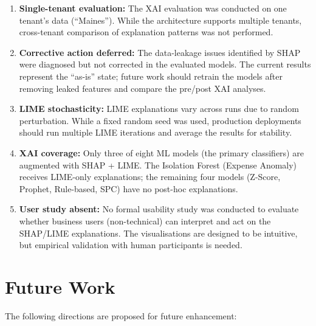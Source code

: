 \documentclass[12pt,a4paper]{report}
\begin{document}
\begin{enumerate}[label=\arabic*.]
  \item \textbf{Single-tenant evaluation:} The XAI evaluation was conducted on one tenant's data (``Maines''). While the architecture supports multiple tenants, cross-tenant comparison of explanation patterns was not performed.

  \item \textbf{Corrective action deferred:} The data-leakage issues identified by SHAP were diagnosed but not corrected in the evaluated models. The current results represent the ``as-is'' state; future work should retrain the models after removing leaked features and compare the pre/post XAI analyses.

  \item \textbf{LIME stochasticity:} LIME explanations vary across runs due to random perturbation. While a fixed random seed was used, production deployments should run multiple LIME iterations and average the results for stability.

  \item \textbf{XAI coverage:} Only three of eight ML models (the primary classifiers) are augmented with SHAP + LIME. The Isolation Forest (Expense Anomaly) receives LIME-only explanations; the remaining four models (Z-Score, Prophet, Rule-based, SPC) have no post-hoc explanations.

  \item \textbf{User study absent:} No formal usability study was conducted to evaluate whether business users (non-technical) can interpret and act on the SHAP/LIME explanations. The visualisations are designed to be intuitive, but empirical validation with human participants is needed.
\end{enumerate}

\section{Future Work}
\label{sec:future_work}

The following directions are proposed for future enhancement:
\end{document}
